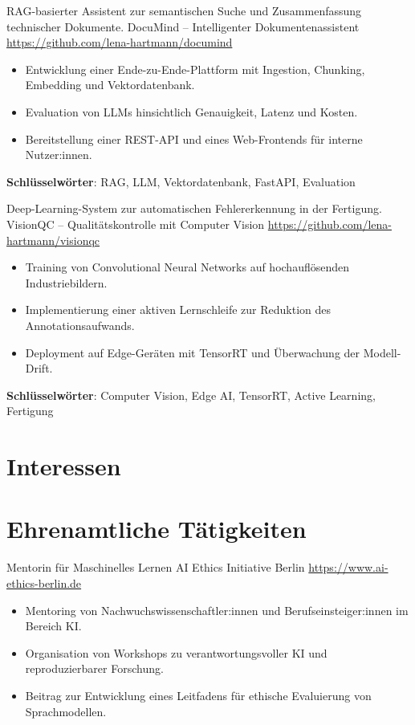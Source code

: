 \documentclass[a4paper, serif, 10pt]{moderncv}
\begin{document}
        {RAG-basierter Assistent zur semantischen Suche und Zusammenfassung technischer Dokumente.}
        {DocuMind – Intelligenter Dokumentenassistent}
        {\url{https://github.com/lena-hartmann/documind}}
        {}
        {\begin{itemize}
\item Entwicklung einer Ende-zu-Ende-Plattform mit Ingestion, Chunking, Embedding und Vektordatenbank.
\item Evaluation von LLMs hinsichtlich Genauigkeit, Latenz und Kosten.
\item Bereitstellung einer REST-API und eines Web-Frontends für interne Nutzer:innen.
\end{itemize}
\textbf{Schlüsselwörter}: RAG, LLM, Vektordatenbank, FastAPI, Evaluation}

        {Deep-Learning-System zur automatischen Fehlererkennung in der Fertigung.}
        {VisionQC – Qualitätskontrolle mit Computer Vision}
        {\url{https://github.com/lena-hartmann/visionqc}}
        {}
        {\begin{itemize}
\item Training von Convolutional Neural Networks auf hochauflösenden Industriebildern.
\item Implementierung einer aktiven Lernschleife zur Reduktion des Annotationsaufwands.
\item Deployment auf Edge-Geräten mit TensorRT und Überwachung der Modell-Drift.
\end{itemize}
\textbf{Schlüsselwörter}: Computer Vision, Edge AI, TensorRT, Active Learning, Fertigung}
\section{Interessen}

\section{Ehrenamtliche Tätigkeiten}

        {Mentorin für Maschinelles Lernen}
        {AI Ethics Initiative Berlin}
        {\url{https://www.ai-ethics-berlin.de}}
        {}
        {\begin{itemize}
\item Mentoring von Nachwuchswissenschaftler:innen und Berufseinsteiger:innen im Bereich KI.
\item Organisation von Workshops zu verantwortungsvoller KI und reproduzierbarer Forschung.
\item Beitrag zur Entwicklung eines Leitfadens für ethische Evaluierung von Sprachmodellen.
\end{itemize}}
    
\end{document}
